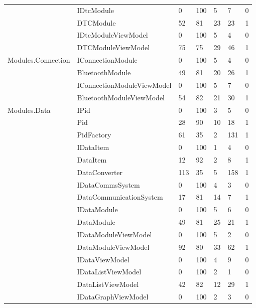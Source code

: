 {{\begin{table}[ht]
\begin{scriptsize}
\begin{center}
\begin{tabularx}{\textwidth}{| l | X | l | l | l | l | l |}
											    & IDtcModule & 0 & 100 & 5 & 7 & 0\\\cline{2-7}
											    & DTCModule & 52 & 81 & 23 & 23 & 1\\\cline{2-7}
											    & IDtcModuleViewModel & 0  & 100 & 5 & 4 & 0\\\cline{2-7}
											    & DTCModuleViewModel & 75 & 75 & 29 & 46 & 1\\\cline{2-7}
				\hline
				\multirow{4}{*}{Modules.Connection} & IConnectionModule & 0 & 100 & 5 & 4 & 0\\\cline{2-7}
									  		  		& BluetoothModule & 49 & 81 & 20 & 26 & 1\\\cline{2-7}
									  		  		& IConnectionModuleViewModel & 0 & 100 & 5 & 7 & 0\\\cline{2-7}
									  		  		& BluetoothModuleViewModel & 54 & 82 & 21 & 30 & 1\\\cline{2-7}
				\hline
				\multirow{17}{*}{Modules.Data} & IPid & 0 & 100 & 3 & 5 & 0\\\cline{2-7}
											   & Pid & 28 & 90 & 10 & 18 & 1\\\cline{2-7}
											   & PidFactory & 61 & 35 & 2 & 131 & 1\\\cline{2-7}
											   & IDataItem & 0 & 100 & 1 & 4 & 0\\\cline{2-7}
											   & DataItem & 12 & 92 & 2 & 8 & 1\\\cline{2-7}
											   & DataConverter & 113 & 35 & 5 & 158 & 1\\\cline{2-7}
											   & IDataCommsSystem & 0 & 100 & 4 & 3 & 0\\\cline{2-7}
											   & DataCommunicationSystem & 17 & 81 & 14 & 7 & 1\\\cline{2-7}
											   & IDataModule & 0 & 100 & 5 & 6 & 0\\\cline{2-7}
											   & DataModule & 49 & 81 & 25 & 21 & 1\\\cline{2-7}
											   & IDataModuleViewModel & 0 & 100 & 5 & 2 & 0\\\cline{2-7}
											   & DataModuleViewModel & 92 & 80 & 33 & 62 & 1\\\cline{2-7}
											   & IDataViewModel & 0 & 100 & 4 & 9 & 0\\\cline{2-7}
											   & IDataListViewModel & 0 & 100 & 2 & 1 & 0\\\cline{2-7}
											   & DataListViewModel & 42 & 82 & 12 & 29 & 1\\\cline{2-7}
											   & IDataGraphViewModel & 0 & 100 & 2 & 3 & 0\\\cline{2-7}

\end{tabularx}
\end{center}
\end{scriptsize}
\end{table}}}

